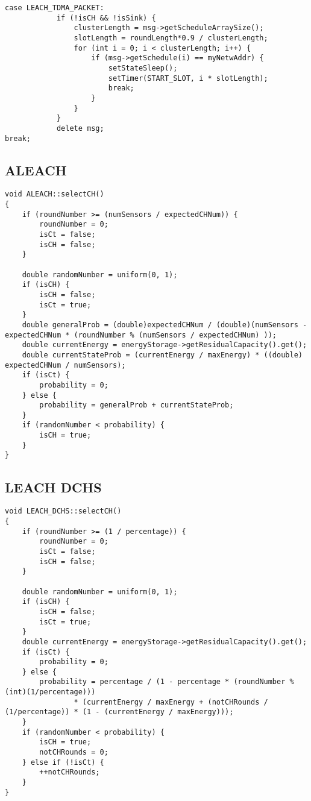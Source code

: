 \begin{verbatim}
case LEACH_TDMA_PACKET:
            if (!isCH && !isSink) {
                clusterLength = msg->getScheduleArraySize();
                slotLength = roundLength*0.9 / clusterLength;
                for (int i = 0; i < clusterLength; i++) {
                    if (msg->getSchedule(i) == myNetwAddr) {
                        setStateSleep();
                        setTimer(START_SLOT, i * slotLength);
                        break;
                    }
                }
            }
            delete msg;
break;
\end{verbatim}
\subsection{ALEACH}
\begin{verbatim}
void ALEACH::selectCH()
{
    if (roundNumber >= (numSensors / expectedCHNum)) {
        roundNumber = 0;
        isCt = false;
        isCH = false;
    }

    double randomNumber = uniform(0, 1);
    if (isCH) {
        isCH = false;
        isCt = true;
    }
    double generalProb = (double)expectedCHNum / (double)(numSensors - expectedCHNum * (roundNumber % (numSensors / expectedCHNum) ));
    double currentEnergy = energyStorage->getResidualCapacity().get();
    double currentStateProb = (currentEnergy / maxEnergy) * ((double) expectedCHNum / numSensors);
    if (isCt) {
        probability = 0;
    } else {
        probability = generalProb + currentStateProb;
    }
    if (randomNumber < probability) {
        isCH = true;
    }
}
\end{verbatim}
\subsection{LEACH DCHS}
\begin{verbatim}
void LEACH_DCHS::selectCH()
{
    if (roundNumber >= (1 / percentage)) {
        roundNumber = 0;
        isCt = false;
        isCH = false;
    }

    double randomNumber = uniform(0, 1);
    if (isCH) {
        isCH = false;
        isCt = true;
    }
    double currentEnergy = energyStorage->getResidualCapacity().get();
    if (isCt) {
        probability = 0;
    } else {
        probability = percentage / (1 - percentage * (roundNumber % (int)(1/percentage)))
                * (currentEnergy / maxEnergy + (notCHRounds / (1/percentage)) * (1 - (currentEnergy / maxEnergy)));
    }
    if (randomNumber < probability) {
        isCH = true;
        notCHRounds = 0;
    } else if (!isCt) {
        ++notCHRounds;
    }
}
\end{verbatim}
